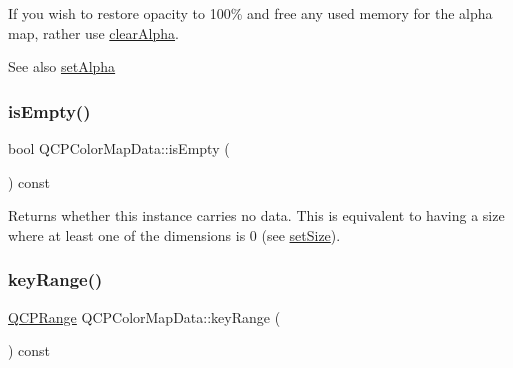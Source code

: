 If you wish to restore opacity to 100\% and free any used memory for the alpha map, rather use \mbox{\hyperlink{class_q_c_p_color_map_data_a14d08b9c3720cd719400079b86d3906b}{clear\+Alpha}}.

\begin{DoxySeeAlso}{See also}
\mbox{\hyperlink{class_q_c_p_color_map_data_aaf7de5b34c58f38d8f4c1ceb064a876c}{set\+Alpha}} 
\end{DoxySeeAlso}
\mbox{\label{class_q_c_p_color_map_data_aea88cc75a76ca571acf29b2ba8ac970d}} 
\subsubsection{\texorpdfstring{isEmpty()}{isEmpty()}}
{\footnotesize\ttfamily bool Q\+C\+P\+Color\+Map\+Data\+::is\+Empty (\begin{DoxyParamCaption}{ }\end{DoxyParamCaption}) const\hspace{0.3cm}{\ttfamily [inline]}}

Returns whether this instance carries no data. This is equivalent to having a size where at least one of the dimensions is 0 (see \mbox{\hyperlink{class_q_c_p_color_map_data_a0d9ff35c299d0478b682bfbcdd9c097e}{set\+Size}}). \mbox{\label{class_q_c_p_color_map_data_a1e43abd20a77b922b7cecfc69bf4dad7}} 
\subsubsection{\texorpdfstring{keyRange()}{keyRange()}}
{\footnotesize\ttfamily \mbox{\hyperlink{class_q_c_p_range}{Q\+C\+P\+Range}} Q\+C\+P\+Color\+Map\+Data\+::key\+Range (\begin{DoxyParamCaption}{ }\end{DoxyParamCaption}) const\hspace{0.3cm}{\ttfamily [inline]}}

\mbox{\label{class_q_c_p_color_map_data_abbda4d28de97aedce1e6e6f008a0a1f7}} 
